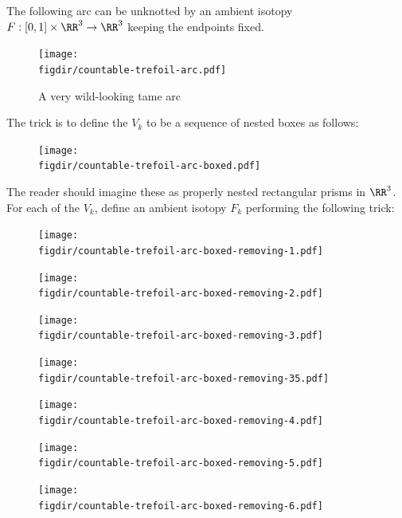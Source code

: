 \begin{example}\label{ex:countable-trefoil-arc}
  The following arc can be unknotted by an ambient isotopy $F : [0,1]
  \times \RR^3 \to \RR^3$ keeping the endpoints fixed.
  \begin{figure}[H]
    \centering
    \texttt{[image: \\figdir/countable-trefoil-arc.pdf]}
    \caption{A very wild-looking tame arc}
  \end{figure}
  The trick is to define the $V_k$ to be a sequence of nested boxes as
  follows:
  \begin{figure}[H]
    \centering
    \texttt{[image: \\figdir/countable-trefoil-arc-boxed.pdf]}
  \end{figure}
  The reader should imagine these as properly nested rectangular
  prisms in $\RR^3$. For each of the $V_k$, define an ambient isotopy
  $F_k$ performing the following trick:
  \begin{figure}[H]
    \centering
    \texttt{[image: \\figdir/countable-trefoil-arc-boxed-removing-1.pdf]}
  \end{figure}
  \begin{figure}[H]
    \centering
    \texttt{[image: \\figdir/countable-trefoil-arc-boxed-removing-2.pdf]}
  \end{figure}
  \begin{figure}[H]
    \centering
    \texttt{[image: \\figdir/countable-trefoil-arc-boxed-removing-3.pdf]}
  \end{figure}
  \begin{figure}[H]
    \centering
    \texttt{[image: \\figdir/countable-trefoil-arc-boxed-removing-35.pdf]}
  \end{figure}
  \begin{figure}[H]
    \centering
    \texttt{[image: \\figdir/countable-trefoil-arc-boxed-removing-4.pdf]}
  \end{figure}
  \begin{figure}[H]
    \centering
    \texttt{[image: \\figdir/countable-trefoil-arc-boxed-removing-5.pdf]}
  \end{figure}
  \begin{figure}[H]
    \centering
    \texttt{[image: \\figdir/countable-trefoil-arc-boxed-removing-6.pdf]}

\end{figure}
\end{example}
